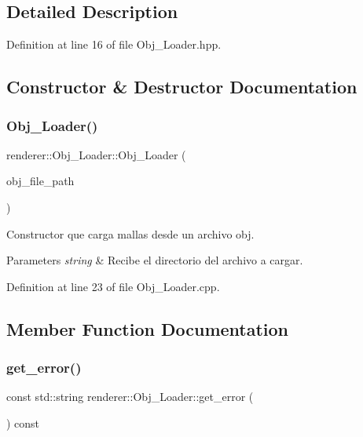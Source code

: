\subsection{Detailed Description}


Definition at line 16 of file Obj\+\_\+\+Loader.\+hpp.



\subsection{Constructor \& Destructor Documentation}
\mbox{\label{classrenderer_1_1_obj___loader_ad6709f396cb0203c20f3f4b82722570b}} 
\subsubsection{\texorpdfstring{Obj\_Loader()}{Obj\_Loader()}}
{\footnotesize\ttfamily renderer\+::\+Obj\+\_\+\+Loader\+::\+Obj\+\_\+\+Loader (\begin{DoxyParamCaption}\item[{const std\+::string \&}]{obj\+\_\+file\+\_\+path }\end{DoxyParamCaption})}

Constructor que carga mallas desde un archivo obj. 
\begin{DoxyParams}{Parameters}
{\em string} & Recibe el directorio del archivo a cargar. \\
\hline
\end{DoxyParams}


Definition at line 23 of file Obj\+\_\+\+Loader.\+cpp.



\subsection{Member Function Documentation}
\mbox{\label{classrenderer_1_1_obj___loader_a66ea56ee2d007bd9fc962889316b831c}} 
\subsubsection{\texorpdfstring{get\_error()}{get\_error()}}
{\footnotesize\ttfamily const std\+::string renderer\+::\+Obj\+\_\+\+Loader\+::get\+\_\+error (\begin{DoxyParamCaption}{ }\end{DoxyParamCaption}) const\hspace{0.3cm}{\ttfamily [inline]}}



